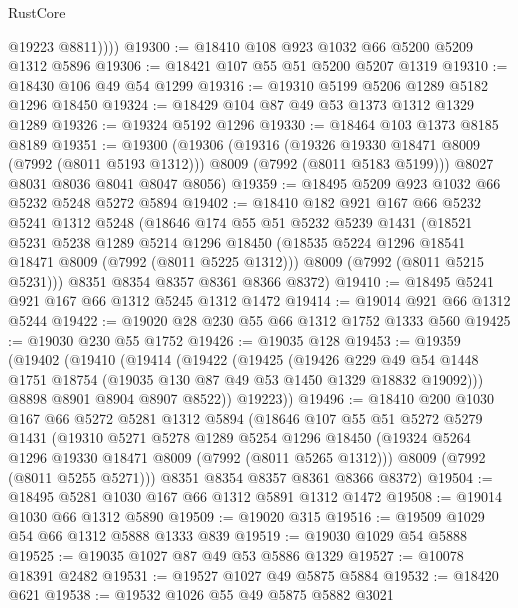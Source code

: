 \begin{lexlean}{RustCore}
\begin{coremodule}
            @19223
            @8811))))
@19300 := @18410 @108 @923 @1032 @66 @5200 @5209 @1312 @5896
@19306 := @18421 @107 @55 @51 @5200 @5207 @1319
@19310 := @18430 @106 @49 @54 @1299
@19316 := @19310 @5199 @5206 @1289 @5182 @1296 @18450
@19324 := @18429 @104 @87 @49 @53 @1373 @1312 @1329 @1289
@19326 := @19324 @5192 @1296
@19330 := @18464 @103 @1373 @8185 @8189
@19351 := @19300
    (@19306
      (@19316
        (@19326 @19330 @18471 @8009 (@7992 (@8011 @5193 @1312)))
        @8009
        (@7992 (@8011 @5183 @5199)))
      @8027
      @8031
      @8036
      @8041
      @8047
      @8056)
@19359 := @18495 @5209 @923 @1032 @66 @5232 @5248 @5272 @5894
@19402 := @18410
    @182
    @921
    @167
    @66
    @5232
    @5241
    @1312
    @5248
    (@18646
      @174
      @55
      @51
      @5232
      @5239
      @1431
      (@18521
        @5231
        @5238
        @1289
        @5214
        @1296
        @18450
        (@18535 @5224 @1296 @18541 @18471 @8009 (@7992 (@8011 @5225 @1312)))
        @8009
        (@7992 (@8011 @5215 @5231)))
      @8351
      @8354
      @8357
      @8361
      @8366
      @8372)
@19410 := @18495 @5241 @921 @167 @66 @1312 @5245 @1312 @1472
@19414 := @19014 @921 @66 @1312 @5244
@19422 := @19020 @28 @230 @55 @66 @1312 @1752 @1333 @560
@19425 := @19030 @230 @55 @1752
@19426 := @19035 @128
@19453 := @19359
    (@19402
      (@19410
        (@19414
          (@19422
            (@19425
              (@19426
                @229
                @49
                @54
                @1448
                @1751
                @18754
                (@19035 @130 @87 @49 @53 @1450 @1329 @18832 @19092)))
            @8898
            @8901
            @8904
            @8907
            @8522))
        @19223))
@19496 := @18410
    @200
    @1030
    @167
    @66
    @5272
    @5281
    @1312
    @5894
    (@18646
      @107
      @55
      @51
      @5272
      @5279
      @1431
      (@19310
        @5271
        @5278
        @1289
        @5254
        @1296
        @18450
        (@19324 @5264 @1296 @19330 @18471 @8009 (@7992 (@8011 @5265 @1312)))
        @8009
        (@7992 (@8011 @5255 @5271)))
      @8351
      @8354
      @8357
      @8361
      @8366
      @8372)
@19504 := @18495 @5281 @1030 @167 @66 @1312 @5891 @1312 @1472
@19508 := @19014 @1030 @66 @1312 @5890
@19509 := @19020 @315
@19516 := @19509 @1029 @54 @66 @1312 @5888 @1333 @839
@19519 := @19030 @1029 @54 @5888
@19525 := @19035 @1027 @87 @49 @53 @5886 @1329
@19527 := @10078 @18391 @2482
@19531 := @19527 @1027 @49 @5875 @5884
@19532 := @18420 @621
@19538 := @19532 @1026 @55 @49 @5875 @5882 @3021

\end{coremodule}
\end{lexlean}
